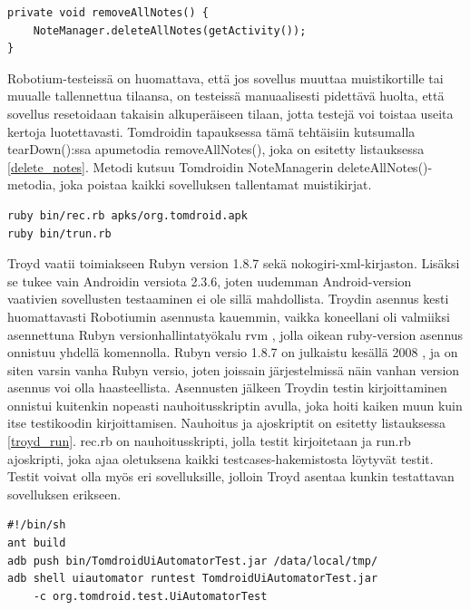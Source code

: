 \begin{lstlisting}[float,label=delete_notes,caption=Muistikirjojen poisto]
private void removeAllNotes() {
	NoteManager.deleteAllNotes(getActivity());
}
\end{lstlisting}

Robotium-testeissä on huomattava, että jos sovellus muuttaa muistikortille tai muualle tallennettua tilaansa, on testeissä manuaalisesti pidettävä huolta, että sovellus resetoidaan takaisin alkuperäiseen tilaan, jotta testejä voi toistaa useita kertoja luotettavasti. Tomdroidin tapauksessa tämä tehtäisiin kutsumalla tearDown():ssa apumetodia removeAllNotes(), joka on esitetty listauksessa \ref{delete_notes}. Metodi kutsuu Tomdroidin NoteManagerin deleteAllNotes()-metodia, joka poistaa kaikki sovelluksen tallentamat muistikirjat.

\begin{lstlisting}[float, label=troyd_run, caption=Troyd-nauhoitusskriptin ja testien ajaminen]
ruby bin/rec.rb apks/org.tomdroid.apk
ruby bin/trun.rb
\end{lstlisting}

Troyd vaatii toimiakseen Rubyn version 1.8.7 sekä nokogiri-xml-kirjaston. Lisäksi se tukee vain Androidin versiota 2.3.6, joten uudemman Android-version vaativien sovellusten testaaminen ei ole sillä mahdollista. Troydin asennus kesti huomattavasti Robotiumin asennusta kauemmin, vaikka koneellani oli valmiiksi asennettuna Rubyn versionhallintatyökalu rvm \cite{rvm}, jolla oikean ruby-version asennus onnistuu yhdellä komennolla. Rubyn versio 1.8.7 on julkaistu kesällä 2008 \cite{ruby_187}, ja on siten varsin vanha Rubyn versio, joten joissain järjestelmissä näin vanhan version asennus voi olla haasteellista. Asennusten jälkeen Troydin testin kirjoittaminen onnistui kuitenkin nopeasti nauhoitusskriptin avulla, joka hoiti kaiken muun kuin itse testikoodin kirjoittamisen. Nauhoitus ja ajoskriptit on esitetty listauksessa \ref{troyd_run}. rec.rb on nauhoitusskripti, jolla testit kirjoitetaan ja run.rb ajoskripti, joka ajaa oletuksena kaikki testcases-hakemistosta löytyvät testit. Testit voivat olla myös eri sovelluksille, jolloin Troyd asentaa kunkin testattavan sovelluksen erikseen.

\begin{lstlisting}[float, label=uiautomator_run,caption=Uiautomator-testien ajaminen]
#!/bin/sh
ant build
adb push bin/TomdroidUiAutomatorTest.jar /data/local/tmp/
adb shell uiautomator runtest TomdroidUiAutomatorTest.jar 
    -c org.tomdroid.test.UiAutomatorTest
\end{lstlisting}

